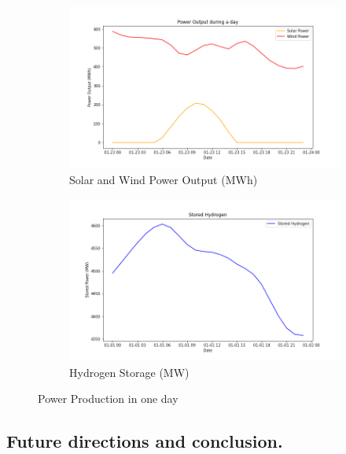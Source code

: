 \documentclass[english]{article}
\numberwithin{definition}{section}
\numberwithin{theorem}{section}
\numberwithin{problem}{section}
\begin{document}
\begin{figure}[H]
\centering
\begin{subfigure}{.5\textwidth}
  \centering
  \includegraphics[width=\linewidth]{immagini/ImmaginiOptimization/balancedPowerOutputday.png}
  \caption{Solar and Wind Power Output (MWh)}
  \label{fig:balance day power}
\end{subfigure}%
\begin{subfigure}{.5\textwidth}
  \centering
  \includegraphics[width=\linewidth]{immagini/ImmaginiOptimization/balanceHH1day.png}
  \caption{ Hydrogen Storage (MW)}
  \label{fig:balanced day hydrogen}
\end{subfigure}
\caption{Power Production in one day}
\label{fig:balanced day}
\end{figure}


\subsection{Future directions and conclusion.}
\end{document}
